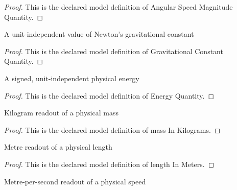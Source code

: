 \begin{proof}
  This is the declared model definition of Angular Speed Magnitude Quantity.
\end{proof}
\begin{definition}
  \label{def:physics:phyx-mini-0714:phyxminiproblems-problemphyxmini0714-gravitationalconstantquantity}
  A unit-independent value of Newton's gravitational constant
\end{definition}
\begin{proof}
  This is the declared model definition of Gravitational Constant Quantity.
\end{proof}
\begin{definition}
  \label{def:physics:phyx-mini-0714:phyxminiproblems-problemphyxmini0714-energyquantity}
  A signed, unit-independent physical energy
\end{definition}
\begin{proof}
  This is the declared model definition of Energy Quantity.
\end{proof}
\begin{definition}
  \label{def:physics:phyx-mini-0714:phyxminiproblems-problemphyxmini0714-massinkilograms}
  Kilogram readout of a physical mass
\end{definition}
\begin{proof}
  This is the declared model definition of mass In Kilograms.
\end{proof}
\begin{definition}
  \label{def:physics:phyx-mini-0714:phyxminiproblems-problemphyxmini0714-lengthinmeters}
  Metre readout of a physical length
\end{definition}
\begin{proof}
  This is the declared model definition of length In Meters.
\end{proof}
\begin{definition}
  \label{def:physics:phyx-mini-0714:phyxminiproblems-problemphyxmini0714-speedinmeterspersecond}
  Metre-per-second readout of a physical speed
\end{definition}
